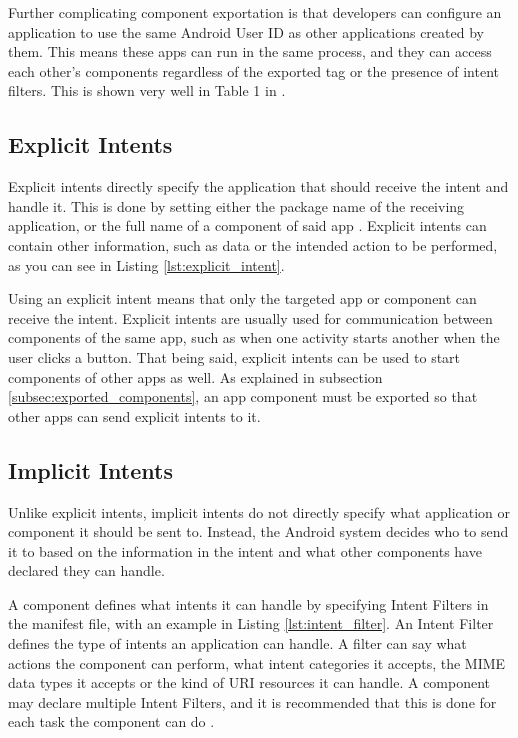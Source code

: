     Further complicating component exportation is that developers can configure an application to use the same Android User ID as other applications created by them. This means these apps can run in the same process, and they can access each other’s components regardless of the exported tag or the presence of intent filters. This is shown very well in Table 1 in \cite{2013_permission_leaks_study}.
    
    \subsection{Explicit Intents}
        \label{subsec:explicit_intents}
        
    Explicit intents directly specify the application that should receive the intent and handle it. This is done by setting either the package name of the receiving application, or the full name of a component of said app \cite{intents_and_intent_filters}. Explicit intents can contain other information, such as data or the intended action to be performed, as you can see in Listing \ref{lst:explicit_intent}.
    
    Using an explicit intent means that only the targeted app or component can receive the intent. Explicit intents are usually used for communication between components of the same app, such as when one activity starts another when the user clicks a button. That being said, explicit intents can be used to start components of other apps as well. As explained in subsection \ref{subsec:exported_components}, an app component must be exported so that other apps can send explicit intents to it.
    
    
    
    \subsection{Implicit Intents}
        \label{subsec:implicit_intents}
        
    Unlike explicit intents, implicit intents do not directly specify what application or component it should be sent to. Instead, the Android system decides who to send it to based on the information in the intent and what other components have declared they can handle.
    
    A component defines what intents it can handle by specifying Intent Filters in the manifest file, with an example in Listing \ref{lst:intent_filter}. An Intent Filter defines the type of intents an application can handle. A filter can say what actions the component can perform, what intent categories it accepts, the MIME data types it accepts or the kind of URI resources it can handle. A component may declare multiple Intent Filters, and it is recommended that this is done for each task the component can do \cite{intents_and_intent_filters}.
    
